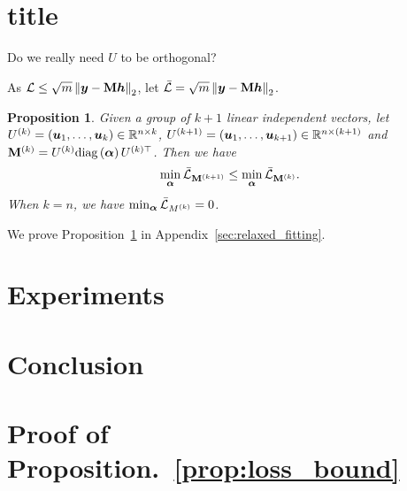 \documentclass{article} %
\def\valpha{{\bm\alpha}}
\newtheorem{proposition}{\textbf{Proposition}} %
\begin{document}
\section{title}


Do we really need $U$ to be orthogonal?

As ${\mathcal{L}}\leq\sqrt{m}\left\|{\bm{y}}-{\mathbf{M}}{\bm{h}}\right\|_2$, let $\bar{{\mathcal{L}}}=\sqrt{m}\left\|{\bm{y}}-{\mathbf{M}}{\bm{h}}\right\|_2$.
\begin{proposition}
	\label{prop:relaxed_fitting}
	Given a group of $k+1$ linear independent vectors, let $U^{(k)}=\left({\bm{u}}_1,\dots,{\bm{u}}_k\right)\in{\mathbb{R}}^{n\times k}$, $U^{(k+1)}=\left({\bm{u}}_1,\dots,{\bm{u}}_{k+1}\right)\in{\mathbb{R}}^{n\times(k+1)}$ and $\rmM^{(k)}=U^{(k)}\mathrm{diag}\left(\valpha\right)U^{(k)\top}$.
	Then we have
	\begin{equation}
		\begin{aligned}
			\min_{\valpha}\bar\gL_{\rmM^{(k+1)}}\leq\min_{\valpha}\bar\gL_{\rmM^{(k)}}.
		\end{aligned}
	\end{equation}
	When $k=n$, we have $\min_{\valpha}\bar\gL_{M^{(k)}}=0$.
\end{proposition}
We prove Proposition~\ref{prop:relaxed_fitting} in Appendix~\ref{sec:relaxed_fitting}.


\section{Experiments}


\section{Conclusion}







\appendix

\section{Proof of Proposition.~\ref{prop:loss_bound}}
\label{sec:deriviation}
\end{document}
